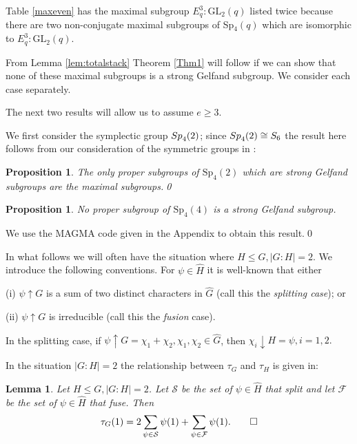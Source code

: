 \documentclass[10pt,a4paper]{amsart}
\newtheorem{lem}[thm]{Lemma}
\newtheorem{prop}[thm]{Proposition}
\theoremstyle{plain}
\theoremstyle{definition}
\numberwithin{equation}{section}
\begin{document}
Table \ref{maxeven} has the maximal  subgroup $E_q^3 \colon \mathrm{GL}_2(q)$ listed twice because there are two  non-conjugate maximal subgroups of Sp$_4(q)$ which are isomorphic to $E_q^3 \colon \mathrm{GL}_2(q)$. 


From Lemma \ref {lem:totalstack} Theorem \ref {Thm1} will follow if we can show that none of these maximal subgroups is a strong Gelfand subgroup. We consider each case separately.

The next two results  will allow us to assume   $e\ge 3$.   

We first  consider  the symplectic group ${\rm Sp}_4(2)$; since ${\rm Sp}_4(2)\cong S_6$ the result here follows from our consideration of the symmetric groups in 
\cite {AHN}:

\begin{prop} \label{thm:sp2}
The only proper subgroups of $\mathrm{Sp}_4(2)$ which are strong Gelfand subgroups are  the maximal subgroups.\qed
\end{prop}





\begin{prop}\label{cor:sp4}
No proper subgroup of $\mathrm{Sp}_4(4)$ is a strong Gelfand subgroup.
\end{prop}
 We use the MAGMA \cite {Mag} code given in the Appendix  to obtain  this result.\qed\medskip
 
 In what follows we will often have the situation where $H \le G, |G:H|=2$. We introduce the following conventions.
 For $\psi \in \hat H$ it  is well-known \cite {JaL} that either 
 
 \noindent (i) $\psi \uparrow G$ is a sum of two distinct characters  in $\hat G$  (call this the {\it splitting case}); or
 
 \noindent (ii)  $\psi \uparrow G$ is irreducible (call this the {\it fusion} case). 
 
 In the splitting case, if 
  $\psi \uparrow G=\chi_1+\chi_2, \chi_1,\chi_2 \in \hat G$, then $\chi_i\downarrow H=\psi, i=1,2.$
 
\medskip

In the situation $|G:H|=2$ the relationship between $\tau_G$ and $\tau_H$ is given in: 
\begin{lem}\label{lemsplitf}
Let $H\le G, |G:H|=2$. Let $\mathcal S$ be the set of $\psi \in\hat H$ that split and 
let  $\mathcal F$ be the set of $\psi \in\hat H$ that fuse. Then 
$$
\tau_G(1)=2\sum_{\psi \in \mathcal S}\psi(1)+  \sum_{\psi \in \mathcal F}\psi(1).\qed 
$$
\end{lem}
\end{document}
